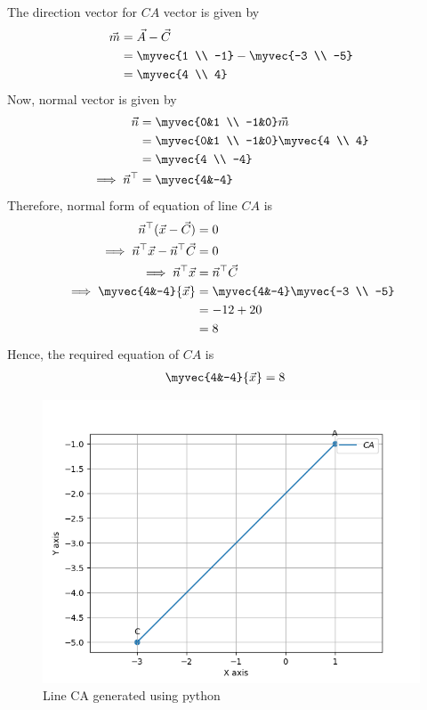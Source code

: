 The direction vector for $CA$ vector is given by
\begin{align}
\vec{m} &= \vec{A} - \vec{C}\\
&= \myvec{1 \\ -1} - \myvec{-3 \\ -5}\\
&= \myvec{4 \\ 4}
\end{align}
Now, normal vector is given by
\begin{align}
\vec{n} &= \myvec{0&1 \\ -1&0}\vec{m}\\
&= \myvec{0&1 \\ -1&0}\myvec{4 \\ 4}\\
&= \myvec{4 \\ -4}\\
\implies \vec{n}^{\top} &= \myvec{4&-4}
\end{align}
Therefore, normal form of equation of line $CA$ is
\begin{align}
\vec{n}^{\top}(\vec{x} - \vec{C}) &= 0 \\
\implies \vec{n}^{\top}{\vec{x}} - \vec{n}^{\top}{\vec{C}} &= 0 \\
\implies \vec{n}^{\top}{\vec{x}} &= \vec{n}^{\top}{\vec{C}} \\
\implies \myvec{4&-4}{\vec{x}} &= \myvec{4&-4}\myvec{-3 \\ -5} \\
&= -12 + 20 \\
&= 8 
\end{align}
Hence, the required equation of $CA$ is
\begin{align}
\myvec{4&-4}{\vec{x}} &= 8 
\end{align}
\begin{figure}
\centering
\includegraphics[width=\columnwidth]{solutions/1/1/5c/figs/fig.png}
\caption{Line CA generated using python}
\label{fig: line_CA_py}
\end{figure}

